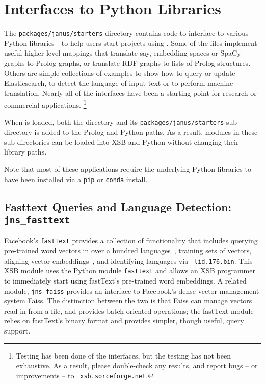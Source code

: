 \section{Interfaces to Python Libraries}

The {\tt packages/janus/starters} directory contains code to interface
to various Python libraries---to help users start projects using
\janus{}.  Some of the files implement useful higher level mappings
that translate say, embedding spaces or SpaCy graphs to Prolog graphs,
or translate RDF graphs to lists of Prolog structures.  Others are
simple collections of examples to show how to query or update
Elasticsearch, to detect the language of input text or to perform
machine translation.  Nearly all of the interfaces have been a
starting point for research or commercial
applications.  \footnote{Testing has been done of the interfaces, but
the testing has not been exhaustive.  As a result, please double-check
any results, and report bugs -- or improvements -- to {\tt
  xsb.sorceforge.net}.}

When \janus{} is loaded, both the \janus{} directory and its
{\tt packages/janus/starters} sub-directory is added to the Prolog and
Python paths.  As a result, modules in these sub-directories can be
loaded into XSB and Python without changing their library paths.

Note that most of these applications require the underlying Python
libraries to have been installed via a {\tt pip} or {\tt conda}
install.

\subsection{Fasttext Queries and Language Detection: {\tt jns\_fasttext}}
%
Facebook's {\tt fastText} provides a collection of functionality that
includes querying pre-trained word vectors in over a hundred
languages~\cite{FBFJM18}, training sets of vectors, aligning vector
embeddings~\cite{MUSE2018}, and identifying languages via {\tt
  lid.176.bin}.  This XSB module uses the Python module {\tt fasttext}
and allows an XSB programmer to immediately start using fastText's
pre-trained word embeddings.  A related module, {\tt jns\_faiss}
provides an interface to Facebook's dense vector management system
Faiss.  The distinction between the two is that Faiss can manage
vectors read in from a file, and provides batch-oriented operations;
the fastText module relies on fastText's binary format and provides
simpler, though useful, query support.

